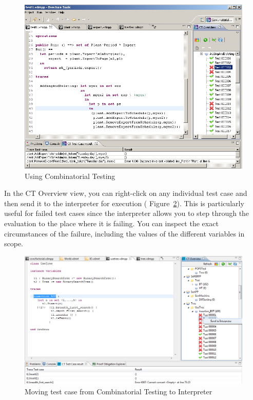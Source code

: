 \documentclass{overturerepchap}
\begin{document}
\begin{figure}[htbp]
\begin{center}
\includegraphics[width=4.5in]{screenDumps/tracesalarm}
\caption{Using Combinatorial Testing\label{fig:tracesalarm}}
\end{center}
\end{figure}

In the CT Overview view, you can right-click on any individual
test case and then send it to the interpreter for execution (\see
Figure~\ref{fig:SendToInterpreter}). This is particularly useful for
failed test cases since the interpreter allows you to step through the
evaluation to the place where it is failing. You can inspect the exact
circumstances of the failure, including the values of the different
variables in scope.

\begin{figure}[htbp]
\begin{center}
\includegraphics[width=4.5in]{screenDumps/SendToInterpreter}
\caption{Moving test case from Combinatorial Testing to Interpreter\label{fig:SendToInterpreter}}
\end{center}
\end{figure}
\end{document}
